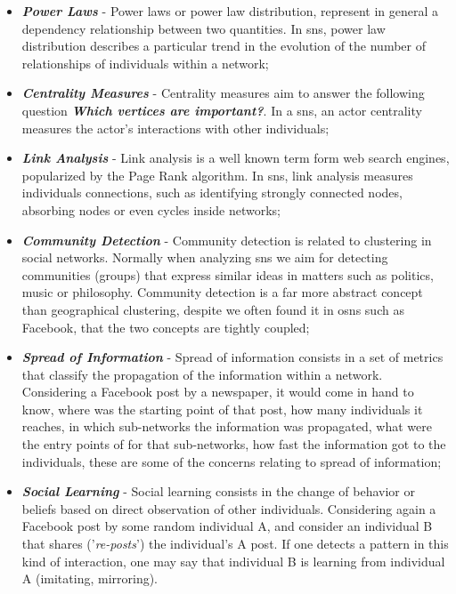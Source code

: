 \begin{itemize}
\item \textbf{\textit{Power Laws}} - Power laws or power law distribution, represent in general a dependency relationship between two quantities. In \glspl{sn}, power law distribution describes a particular trend in the evolution of the number of relationships of individuals within a network;
\item \textbf{\textit{Centrality Measures}} - Centrality measures aim to answer the following question \textit{\textbf{Which vertices are important?}}. In a \glspl{sn}, an actor centrality measures the actor's interactions with other individuals;
\item \textbf{\textit{Link Analysis}} - Link analysis is a well known term form web search engines, popularized by the Page Rank algorithm. In \glspl{sn}, link analysis measures individuals connections, such as identifying strongly connected nodes, absorbing nodes or even cycles inside networks;
\item \textbf{\textit{Community Detection}} - Community detection is related to clustering in social networks. Normally when analyzing \glspl{sn} we aim for detecting communities (groups) that express similar ideas in matters such as politics, music or philosophy. Community detection is a far more abstract concept than geographical clustering, despite we often found it in \glspl{osn} such as Facebook, that the two concepts are tightly coupled;
\item \textbf{\textit{Spread of Information}} - Spread of information consists in a set of metrics that classify the propagation of the information within a network. Considering a Facebook post by a newspaper, it would come in hand to know, where was the starting point of that post, how many individuals it reaches, in which sub-networks the information was propagated, what were the entry points of for that sub-networks, how fast the information got to the individuals, these are some of the concerns relating to spread of information;
\item \textbf{\textit{Social Learning}} - Social learning consists in the change of behavior or beliefs based on direct observation of other individuals. Considering again a Facebook post by some random individual A, and consider an individual B that shares ('\textit{re-posts}') the individual's A post. If one detects a pattern in this kind of interaction, one may say that individual B is learning from individual A (imitating, mirroring).
\end{itemize}

